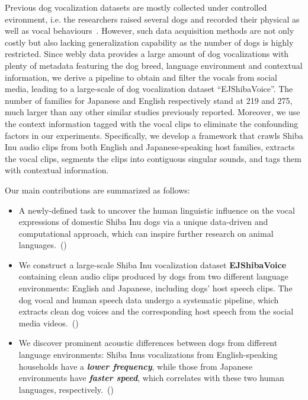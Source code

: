 Previous dog vocalization datasets are mostly collected under controlled evironment, i.e. the researchers raised several dogs and recorded their physical  as well as vocal behaviours~\cite{ide2021rescue, ehsani2018let, 
molnar2008classification, hantke2018my}. However, such data acquisition methods are not only costly but also lacking generalization capability as the number of dogs is highly restricted. 
Since webly data provides a large amount of dog vocalizations with plenty of metadata featuring the dog breed, language environment and contextual information, we derive a pipeline to obtain and filter the vocals from social media, leading to a large-scale of dog vocalization dataset ``EJShibaVoice''.
The number of families for Japanese and English respectively stand at 219 and 275, much larger than any other similar studies previously reported. 
Moreover, we use the context information tagged with the vocal clips to eliminate the confounding factors in our experiments. 
Specifically, we develop 
a framework that crawls Shiba Inu audio clips from both English and 
Japanese-speaking host families, extracts the vocal clips, 
segments the clips into contiguous singular sounds, and tags them with 
contextual information. 


Our main contributions are summarized as follows:

\begin{itemize}
	\item A newly-defined task to uncover the human linguistic influence 
on the vocal expressions of domestic Shiba Inu dogs via a unique data-driven and computational approach, 
which can inspire further research on animal 
languages.~() 
	\item We construct a large-scale Shiba Inu vocalization dataset \textbf{EJShibaVoice} containing clean audio clips produced by dogs from two different language environments: English and Japanese, including dogs' host speech clips. 
The dog vocal and human speech data undergo a systematic pipeline, 
which extracts clean dog voices and the corresponding host speech from 
the social media videos.~()
	\item We discover prominent acoustic differences between dogs 
from different language environments: 
	Shiba Inus vocalizations from English-speaking households have a \textbf{\textit{lower frequency}}, 
while those from Japanese environments have \textbf{\textit{faster speed}}, 
which correlates with these two human languages, respectively.~()%
\end{itemize}
